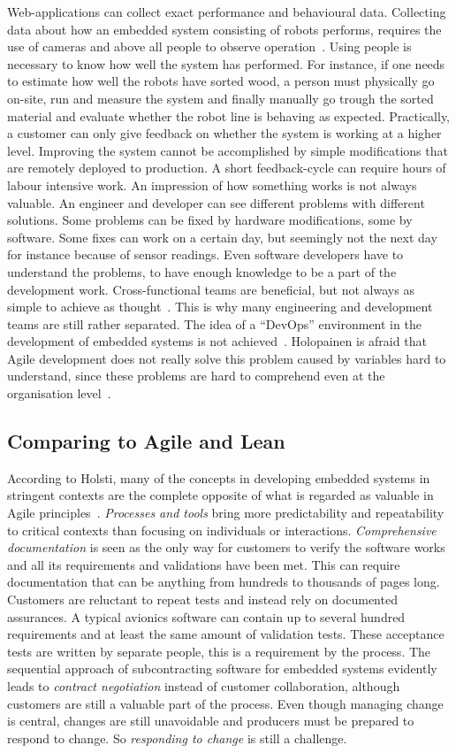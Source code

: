 \documentclass[english]{tktltiki2}
\begin{document}
Web-applications can collect exact performance and behavioural data. Collecting data about how an embedded system consisting of robots performs, requires the use of cameras and above all people to observe operation~\cite{Hol15a}. Using people is necessary to know how well the system has performed. For instance, if one needs to estimate how well the robots have sorted wood, a person must physically go on-site, run and measure the system and finally manually go trough the sorted material and evaluate whether the robot line is behaving as expected. Practically, a customer can only give feedback on whether the system is working at a higher level. Improving the system cannot be accomplished by simple modifications that are remotely deployed to production. A short feedback-cycle can require hours of labour intensive work. An impression of how something works is not always valuable. An engineer and developer can see different problems with different solutions. Some problems can be fixed by hardware modifications, some by software. Some fixes can work on a certain day, but seemingly not the next day for instance because of sensor readings. Even software developers have to understand the problems, to have enough knowledge to be a part of the development work. Cross-functional teams are beneficial, but not always as simple to achieve as thought~\cite{BT15, Hol15a}. This is why many engineering and development teams are still rather separated. The idea of a “DevOps” environment in the development of embedded systems is not achieved~\cite{BT15}. Holopainen is afraid that Agile development does not really solve this problem caused by variables hard to understand, since these problems are hard to comprehend even at the organisation level~\cite{Hol15a}.

\subsection{Comparing to Agile and Lean}

According to Holsti, many of the concepts in developing embedded systems in stringent contexts are the complete opposite of what is regarded as valuable in Agile principles~\cite{Hol15b}. \emph{Processes and tools} bring more predictability and repeatability to critical contexts than focusing on individuals or interactions. \emph{Comprehensive documentation} is seen as the only way for customers to verify the software works and all its requirements and validations have been met. This can require documentation that can be anything from hundreds to thousands of pages long. Customers are reluctant to repeat tests and instead rely on documented assurances. A typical avionics software can contain up to several hundred requirements and at least the same amount of validation tests. These acceptance tests are written by separate people, this is a requirement by the process. The sequential approach of subcontracting software for embedded systems evidently leads to \emph{contract negotiation} instead of customer collaboration, although customers are still a valuable part of the process. Even though managing change is central, changes are still unavoidable and producers must be prepared to respond to change. So \emph{responding to change} is still a challenge.
\end{document}

